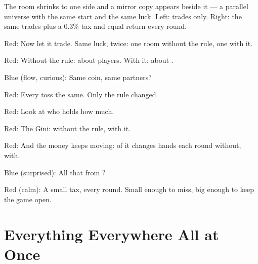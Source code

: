 \label{match}

The room shrinks to one side and a mirror copy appears beside it — a
parallel universe with the same start and the same luck. Left: trades only.
Right: the same trades plus a 0.3\% tax and equal return every round.


Red: Now let it trade. Same luck, twice:
one room without the rule, one with it.
\match
{}

Red: Without the rule: about  players.
With it: about .

Blue (flow, curious): Same coin, same partners?

Red: Every toss the same.
Only the rule changed.


Red: Look at who holds how much.

Red: The Gini:  without the rule,  with it.

Red: And the money keeps moving:
 of it changes hands each round without,  with.

Blue (surprised): All that from ?

Red (calm): A small tax, every round.
Small enough to miss, big enough to keep the game open.

\section{Everything Everywhere All at Once}\label{index:multiverse}

